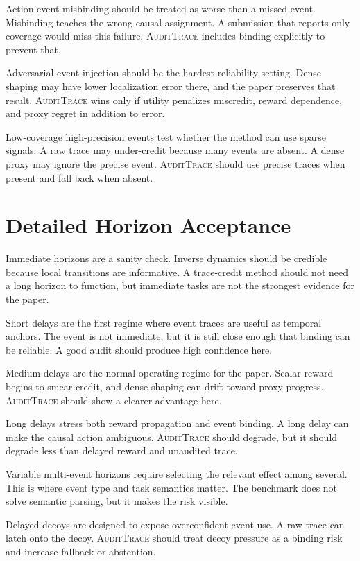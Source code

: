 \documentclass{article}
\newcommand{\method}{\textsc{AuditTrace}\xspace}
\begin{document}
Action-event misbinding should be treated as worse than a missed event. Misbinding teaches the wrong causal assignment. A submission that reports only coverage would miss this failure. \method includes binding explicitly to prevent that.

Adversarial event injection should be the hardest reliability setting. Dense shaping may have lower localization error there, and the paper preserves that result. \method wins only if utility penalizes miscredit, reward dependence, and proxy regret in addition to error.

Low-coverage high-precision events test whether the method can use sparse signals. A raw trace may under-credit because many events are absent. A dense proxy may ignore the precise event. \method should use precise traces when present and fall back when absent.

\section{Detailed Horizon Acceptance}

Immediate horizons are a sanity check. Inverse dynamics should be credible because local transitions are informative. A trace-credit method should not need a long horizon to function, but immediate tasks are not the strongest evidence for the paper.

Short delays are the first regime where event traces are useful as temporal anchors. The event is not immediate, but it is still close enough that binding can be reliable. A good audit should produce high confidence here.

Medium delays are the normal operating regime for the paper. Scalar reward begins to smear credit, and dense shaping can drift toward proxy progress. \method should show a clearer advantage here.

Long delays stress both reward propagation and event binding. A long delay can make the causal action ambiguous. \method should degrade, but it should degrade less than delayed reward and unaudited trace.

Variable multi-event horizons require selecting the relevant effect among several. This is where event type and task semantics matter. The benchmark does not solve semantic parsing, but it makes the risk visible.

Delayed decoys are designed to expose overconfident event use. A raw trace can latch onto the decoy. \method should treat decoy pressure as a binding risk and increase fallback or abstention.
\end{document}
